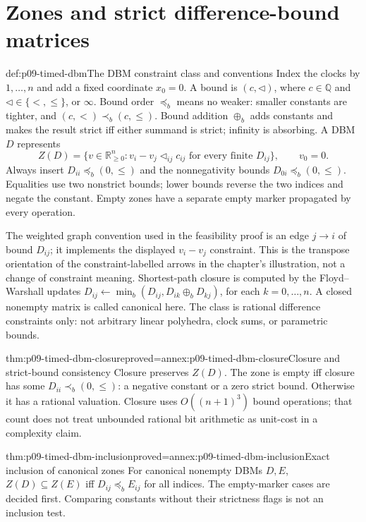 \section{Zones and strict difference-bound matrices}
\label{sec:p09-timed-dbm}

\begin{hbdefinition}{def:p09-timed-dbm}{The DBM constraint class and conventions}
Index the clocks by \(1,\ldots,n\) and add a fixed coordinate \(x_0=0\).
A bound is \((c,\triangleleft)\), where \(c\in\mathbb Q\) and
\(\triangleleft\in\{<,\leq\}\), or \(\infty\). Bound order
\(\preceq_b\) means no weaker: smaller constants are tighter, and
\((c,<)\prec_b(c,\leq)\). Bound addition \(\oplus_b\) adds constants
and makes the result strict iff either summand is strict; infinity is
absorbing. A DBM \(D\) represents
\[
 Z(D)=\{v\in\mathbb R_{\geq0}^n:
               v_i-v_j\mathrel{\triangleleft_{ij}}c_{ij}
               \text{ for every finite }D_{ij}\},\qquad v_0=0.
\]
Always insert \(D_{ii}\preceq_b(0,\leq)\) and the nonnegativity bounds
\(D_{0i}\preceq_b(0,\leq)\). Equalities use two nonstrict bounds;
lower bounds reverse the two indices and negate the constant. Empty
zones have a separate empty marker propagated by every operation.

The weighted graph convention used in the feasibility proof is an edge
\(j\to i\) of bound \(D_{ij}\); it implements the displayed
\(v_i-v_j\) constraint. This is the transpose orientation of the
constraint-labelled arrows in the chapter's illustration, not a change
of constraint meaning. Shortest-path closure is computed by the
Floyd--Warshall updates
\(D_{ij}\leftarrow\min_b(D_{ij},D_{ik}\oplus_bD_{kj})\), for each
\(k=0,\ldots,n\). A closed nonempty matrix is called canonical here.
The class is rational difference constraints only: not arbitrary linear
polyhedra, clock sums, or parametric bounds.
\end{hbdefinition}

\begin{hbtheorem}{thm:p09-timed-dbm-closure}{proved=annex:p09-timed-dbm-closure}{Closure and strict-bound consistency}
Closure preserves \(Z(D)\). The zone is empty iff closure has some
\(D_{ii}\prec_b(0,\leq)\): a negative constant or a zero strict bound.
Otherwise it has a rational valuation. Closure uses \(O((n+1)^3)\)
bound operations; that count does not treat unbounded rational bit
arithmetic as unit-cost in a complexity claim.
\end{hbtheorem}

\begin{hbtheorem}{thm:p09-timed-dbm-inclusion}{proved=annex:p09-timed-dbm-inclusion}{Exact inclusion of canonical zones}
For canonical nonempty DBMs \(D,E\),
\(Z(D)\subseteq Z(E)\) iff \(D_{ij}\preceq_bE_{ij}\) for all indices.
The empty-marker cases are decided first. Comparing constants without
their strictness flags is not an inclusion test.
\end{hbtheorem}

